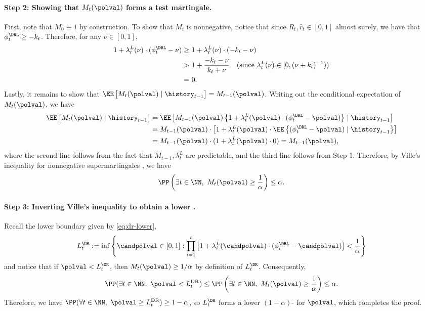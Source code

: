 \paragraph{Step 2: Showing that $M_t(\polval)$ forms a test martingale.}
 First, note that $M_0 \equiv 1$ by construction. To show that $M_t$ is nonnegative, notice that since $R_t, \widehat r_t \in [0, 1]$ almost surely, we have that $\phi_t^\DRL \geq -k_t$. Therefore, for any $\nu \in [0, 1]$, 
\begin{align*}
    1 + \lambda_t^L(\nu) \cdot (\phi_t^\DRL - \nu) 
   \geq \ & 1 + \lambda_t^L(\nu) \cdot (- k_t - \nu) \\
   > \ & 1 + \frac{- k_t - \nu}{k_t + \nu} \ \ \ (\text{since $\lambda_t^L(\nu) \in [0, (\nu + k_t)^{-1})$}) \\
   = \ & 0.
\end{align*}
Lastly, it remains to show that $\EE \left [ M_t(\polval) \mid \history_{t-1} \right ] = M_{t-1}(\polval)$. Writing out the conditional expectation of $M_t(\polval)$, we have
\begin{align*}
    \EE \left [ M_t(\polval) \mid \history_{t-1} \right ] & = \EE \left [ M_{t-1} (\polval) \left \{ 1 + \lambda_t^L(\polval) \cdot (\phi_t^\DRL - \polval) \right \} \mid \history_{t-1} \right ] \\
    & =   M_{t-1}(\polval) \cdot \left [ 1 + \lambda_t^L(\polval) \cdot \EE \left \{ (\phi_t^\DRL - \polval)  \mid \history_{t-1} \right \} \right ] \\
    & =  M_{t-1}(\polval) \cdot (1 + \lambda_t^L(\polval) \cdot 0) = M_{t-1}(\polval), 
\end{align*}
where the second line follows from the fact that $M_{t-1}, \lambda_t^L$ are predictable, and the third line follows from Step 1. Therefore, by Ville's inequality for nonnegative supermartingales \citep{ville1939etude}, we have
\begin{equation}\label{eq:ville}
    \PP \left (\exists t \in \NN,\ M_t(\polval) \geq \frac{1}{\alpha} \right ) \leq \alpha.
\end{equation}

\paragraph{Step 3: Inverting Ville's inequality to obtain a lower \cs{}.} Recall the lower boundary given by \eqref{eq:dr-lower},
\begin{equation*}
    L_t^\DR := \inf \left \{ \candpolval \in [0, 1] : \prod_{i=1}^t \left [ 1 + \lambda_i^L(\candpolval) \cdot (\phi_i^\DRL - \candpolval) \right ] < \frac{1}{\alpha} \right \}
\end{equation*}
and notice that if $\polval < L_t^\DR$, then  $M_t(\polval) \geq 1/\alpha $ by definition of $L_t^\DR$. Consequently,
\begin{equation*}
 \PP(\exists t \in \NN,\ \polval < L_t^\mathrm{DR}) \leq \PP \left (\exists t \in \NN,\ M_t(\polval) \geq \frac{1}{\alpha} \right ) \leq \alpha.
\end{equation*}
 Therefore, we have $\PP(\forall t \in \NN,\ \polval \geq L_t^\mathrm{DR}) \geq 1-\alpha$, so $L_t^\DR$ forms a lower $(1-\alpha)$-\cs{} for $\polval$, which completes the proof.

